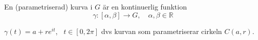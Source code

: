 \begin{definition}
En (parametriserad) kurva i $G$ är en kontinuerlig funktion
\[ \gamma : [\alpha, \beta] \to G, \quad \alpha, \beta \in \mathbb{R} \]
\end{definition}

\begin{example}
$\gamma(t) = a + re^{it}$, \ $t \in [0, 2\pi]$
dvs kurvan som parametriserar cirkeln $C(a, r)$.
\end{example}
